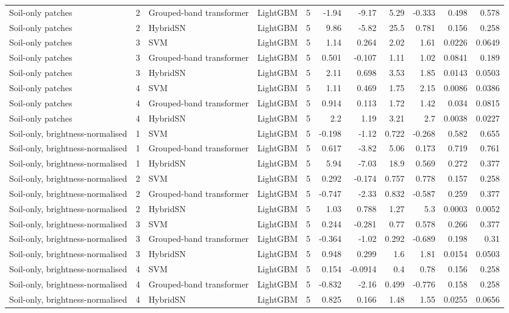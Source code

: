 \begin{table}
\begin{tabular}{lrllrrrrrrr}
Soil-only patches & 2 & Grouped-band transformer & LightGBM & 5 & -1.94 & -9.17 & 5.29 & -0.333 & 0.498 & 0.578 \\
Soil-only patches & 2 & HybridSN & LightGBM & 5 & 9.86 & -5.82 & 25.5 & 0.781 & 0.156 & 0.258 \\
Soil-only patches & 3 & SVM & LightGBM & 5 & 1.14 & 0.264 & 2.02 & 1.61 & 0.0226 & 0.0649 \\
Soil-only patches & 3 & Grouped-band transformer & LightGBM & 5 & 0.501 & -0.107 & 1.11 & 1.02 & 0.0841 & 0.189 \\
Soil-only patches & 3 & HybridSN & LightGBM & 5 & 2.11 & 0.698 & 3.53 & 1.85 & 0.0143 & 0.0503 \\
Soil-only patches & 4 & SVM & LightGBM & 5 & 1.11 & 0.469 & 1.75 & 2.15 & 0.0086 & 0.0386 \\
Soil-only patches & 4 & Grouped-band transformer & LightGBM & 5 & 0.914 & 0.113 & 1.72 & 1.42 & 0.034 & 0.0815 \\
Soil-only patches & 4 & HybridSN & LightGBM & 5 & 2.2 & 1.19 & 3.21 & 2.7 & 0.0038 & 0.0227 \\
Soil-only, brightness-normalised & 1 & SVM & LightGBM & 5 & -0.198 & -1.12 & 0.722 & -0.268 & 0.582 & 0.655 \\
Soil-only, brightness-normalised & 1 & Grouped-band transformer & LightGBM & 5 & 0.617 & -3.82 & 5.06 & 0.173 & 0.719 & 0.761 \\
Soil-only, brightness-normalised & 1 & HybridSN & LightGBM & 5 & 5.94 & -7.03 & 18.9 & 0.569 & 0.272 & 0.377 \\
Soil-only, brightness-normalised & 2 & SVM & LightGBM & 5 & 0.292 & -0.174 & 0.757 & 0.778 & 0.157 & 0.258 \\
Soil-only, brightness-normalised & 2 & Grouped-band transformer & LightGBM & 5 & -0.747 & -2.33 & 0.832 & -0.587 & 0.259 & 0.377 \\
Soil-only, brightness-normalised & 2 & HybridSN & LightGBM & 5 & 1.03 & 0.788 & 1.27 & 5.3 & 0.0003 & 0.0052 \\
Soil-only, brightness-normalised & 3 & SVM & LightGBM & 5 & 0.244 & -0.281 & 0.77 & 0.578 & 0.266 & 0.377 \\
Soil-only, brightness-normalised & 3 & Grouped-band transformer & LightGBM & 5 & -0.364 & -1.02 & 0.292 & -0.689 & 0.198 & 0.31 \\
Soil-only, brightness-normalised & 3 & HybridSN & LightGBM & 5 & 0.948 & 0.299 & 1.6 & 1.81 & 0.0154 & 0.0503 \\
Soil-only, brightness-normalised & 4 & SVM & LightGBM & 5 & 0.154 & -0.0914 & 0.4 & 0.78 & 0.156 & 0.258 \\
Soil-only, brightness-normalised & 4 & Grouped-band transformer & LightGBM & 5 & -0.832 & -2.16 & 0.499 & -0.776 & 0.158 & 0.258 \\
Soil-only, brightness-normalised & 4 & HybridSN & LightGBM & 5 & 0.825 & 0.166 & 1.48 & 1.55 & 0.0255 & 0.0656 \\
\bottomrule
\end{tabular}
\end{table}
